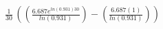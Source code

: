 \documentclass[preview]{standalone}
\begin{document}
\begin{align*}
\frac{1}{30}\,((\frac{6.687e^{ln(0.931)30}}{ln(0.931)})-(\frac{6.687(1)}{ln(0.931)}))
\end{align*}
\end{document}
